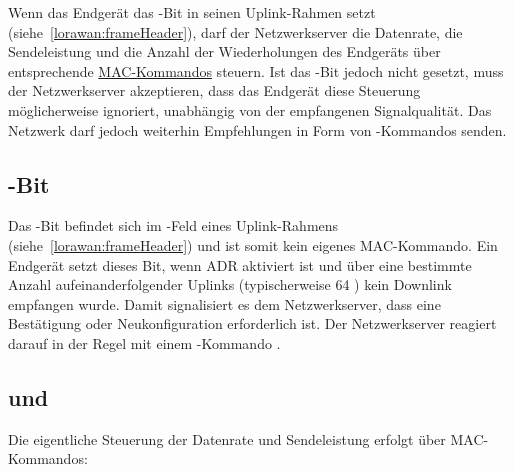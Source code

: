 	Wenn das Endgerät das -Bit in seinen Uplink-Rahmen setzt (siehe~\autoref{lorawan:frameHeader}), darf der Netzwerkserver die Datenrate, die Sendeleistung und die Anzahl der Wiederholungen des Endgeräts über entsprechende \hyperref[lorawan:macCommands]{MAC-Kommandos} steuern. Ist das -Bit jedoch nicht gesetzt, muss der Netzwerkserver akzeptieren, dass das Endgerät diese Steuerung möglicherweise ignoriert, unabhängig von der empfangenen Signalqualität. Das Netzwerk darf jedoch weiterhin Empfehlungen in Form von -Kommandos senden.
	
	\subsection{-Bit}
	Das -Bit befindet sich im -Feld eines Uplink-Rahmens (siehe~\autoref{lorawan:frameHeader}) und ist somit kein eigenes MAC-Kommando. Ein Endgerät setzt dieses Bit, wenn ADR aktiviert ist und über eine bestimmte Anzahl aufeinander­folgender Uplinks (typischerweise 64 \cite[20]{LoRaAlliance:2020b}) kein Downlink empfangen wurde. Damit signalisiert es dem Netzwerkserver, dass eine Bestätigung oder Neukonfiguration erforderlich ist. Der Netzwerkserver reagiert darauf in der Regel mit einem -Kommando \cite{LoRaAlliance:2020b}.
	
	\subsection{ und }
	Die eigentliche Steuerung der Datenrate und Sendeleistung erfolgt über MAC-Kommandos:
	
